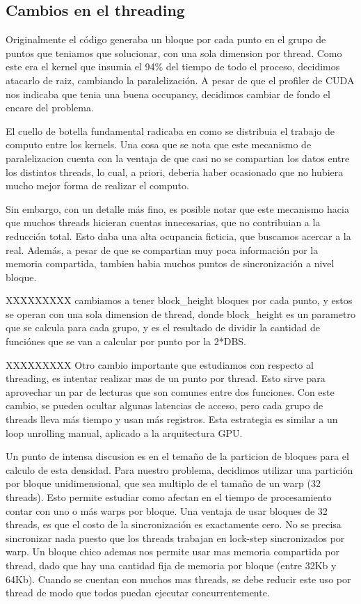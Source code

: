 \subsection{Cambios en el threading}
Originalmente el c\'odigo generaba un bloque por cada punto en el grupo de puntos
que teniamos que solucionar, con una sola dimension por thread.
Como este era el kernel que insumia el 94\% del tiempo de todo el proceso, decidimos
atacarlo de raiz, cambiando la paralelizaci\'on. A pesar de que el profiler de CUDA nos indicaba
que tenia una buena occupancy, decidimos cambiar de fondo el encare del problema.

El cuello de botella fundamental radicaba en como se distribuia el trabajo de computo
entre los kernels. Una cosa que se nota que este mecanismo de paralelizacion cuenta con
la ventaja de que casi no se compartian los datos entre los distintos threads, lo cual,
a priori, deberia haber ocasionado que no hubiera mucho mejor forma de realizar el computo.

Sin embargo, con un detalle m\'as fino, es posible notar que este mecanismo hacia que
muchos threads hicieran cuentas innecesarias, que no contribuian a la reducci\'on total.
Esto daba una alta ocupancia ficticia, que buscamos acercar a la real. Adem\'as, a pesar
de que se compartian muy poca informaci\'on por la memoria compartida, tambien habia muchos
puntos de sincronización a nivel bloque.

XXXXXXXXX cambiamos a tener block\_height bloques por cada punto, y estos se operan
con una sola dimension de thread, donde block\_height es un parametro que se calcula
para cada grupo, y es el resultado de dividir la cantidad de funci\'ones que se van
a calcular por punto por la 2*DBS.

XXXXXXXXX Otro cambio importante que estudiamos con respecto al threading, es intentar realizar
mas de un punto por thread. Esto sirve para aprovechar un par de lecturas que son comunes
entre dos funciones. Con este cambio, se pueden ocultar algunas latencias de acceso, pero
cada grupo de threads lleva m\'as tiempo y usan m\'as registros. Esta estrategia es similar
a un loop unrolling manual, aplicado a la arquitectura GPU.

Un punto de intensa discusion es en el tema\~no de la particion de bloques para el calculo
de esta densidad. Para nuestro problema, decidimos utilizar una partici\'on por bloque
unidimensional, que sea multiplo de el tama\~no de un warp (32 threads). Esto permite
estudiar como afectan en el tiempo de procesamiento contar con uno o m\'as warps por
bloque. Una ventaja de usar bloques de 32 threads, es que el costo de la sincronizaci\'on
es exactamente cero. No se precisa sincronizar nada puesto que los threads trabajan
en lock-step sincronizados por warp. Un bloque chico ademas nos permite usar mas memoria compartida
por thread, dado que hay una cantidad fija de memoria por bloque (entre 32Kb y 64Kb).
Cuando se cuentan con muchos mas threads, se debe reducir este uso por thread de modo que
todos puedan ejecutar concurrentemente.


